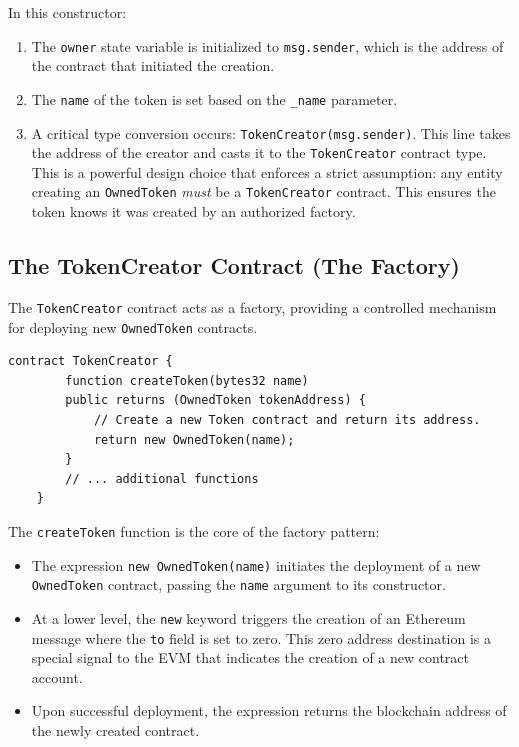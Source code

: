 \documentclass{scrbook}
\begin{document}
In this constructor:

\begin{enumerate}
    \item The \texttt{owner} state variable is initialized to \texttt{msg.sender}, which is the address of the contract that initiated the creation.
    
    \item The \texttt{name} of the token is set based on the \texttt{\_name} parameter.
    
    \item A critical type conversion occurs: \texttt{TokenCreator(msg.sender)}. This line takes the address of the creator and casts it to the \texttt{TokenCreator} contract type. This is a powerful design choice that enforces a strict assumption: any entity creating an \texttt{OwnedToken} \textit{must} be a \texttt{TokenCreator} contract. This ensures the token knows it was created by an authorized factory.
\end{enumerate}

\subsection{The TokenCreator Contract (The Factory)}

The \texttt{TokenCreator} contract acts as a factory, providing a controlled mechanism for deploying new \texttt{OwnedToken} contracts.

\begin{lstlisting}[caption={Token creator}]
    contract TokenCreator {
        function createToken(bytes32 name)
        public returns (OwnedToken tokenAddress) {
            // Create a new Token contract and return its address.
            return new OwnedToken(name);
        }
        // ... additional functions
    }
\end{lstlisting}

The \texttt{createToken} function is the core of the factory pattern:

\begin{itemize}
    \item The expression \texttt{new OwnedToken(name)} initiates the deployment of a new \texttt{OwnedToken} contract, passing the \texttt{name} argument to its constructor.
    
    \item At a lower level, the \texttt{new} keyword triggers the creation of an Ethereum message where the \texttt{to} field is set to zero. This zero address destination is a special signal to the EVM that indicates the creation of a new contract account.
    
    \item Upon successful deployment, the expression returns the blockchain address of the newly created contract.
\end{itemize}
\end{document}
